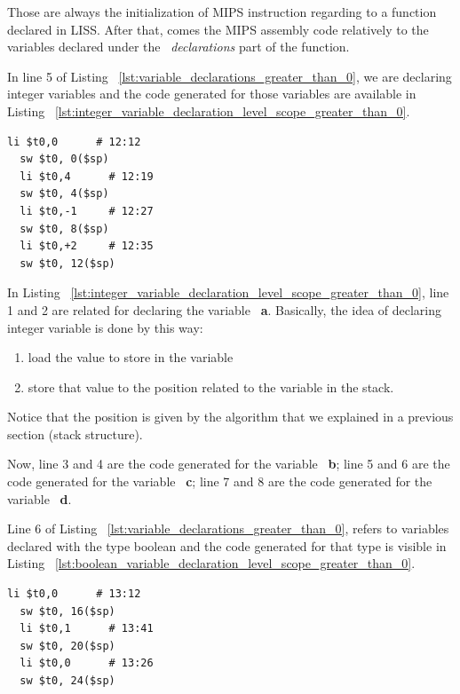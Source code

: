 \documentclass[
  oneside,
  11pt, a4paper,
  footinclude=true,
  headinclude=true,
  cleardoublepage=empty
]{scrbook}
\begin{document}
Those are always the initialization of MIPS instruction regarding to a function declared in LISS. After that, comes the MIPS assembly code relatively to the variables declared under the ~\textit{declarations} part of the function.

In line 5 of Listing ~\ref{lst:variable_declarations_greater_than_0}, we are declaring integer variables and the code generated for those variables are available in Listing ~\ref{lst:integer_variable_declaration_level_scope_greater_than_0}.

\begin{lstlisting}[caption={Declaring integer variables in level scope greater than 0 on MIPS.},label={lst:integer_variable_declaration_level_scope_greater_than_0}]
  li $t0,0		# 12:12
  sw $t0, 0($sp)
  li $t0,4		# 12:19
  sw $t0, 4($sp)
  li $t0,-1		# 12:27
  sw $t0, 8($sp)
  li $t0,+2		# 12:35
  sw $t0, 12($sp)
\end{lstlisting}

In Listing ~\ref{lst:integer_variable_declaration_level_scope_greater_than_0}, line 1 and 2 are related for declaring the variable ~\textbf{a}. Basically, the idea of declaring integer variable is done by this way: 

\begin{enumerate}
\item load the value to store in the variable
\item store that value to the position related to the variable in the stack.
\end{enumerate}

Notice that the position is given by the algorithm that we explained in a previous section (stack structure).

Now, line 3 and 4 are the code generated for the variable ~\textbf{b}; line 5 and 6 are the code generated for the variable ~\textbf{c}; line 7 and 8 are the code generated for the variable ~\textbf{d}.

Line 6 of Listing ~\ref{lst:variable_declarations_greater_than_0}, refers to variables declared with the type boolean and the code generated for that type is visible in Listing ~\ref{lst:boolean_variable_declaration_level_scope_greater_than_0}.

\begin{lstlisting}[caption={Declaring boolean variables in level scope greater than 0},label={lst:boolean_variable_declaration_level_scope_greater_than_0}]
  li $t0,0		# 13:12
  sw $t0, 16($sp)
  li $t0,1		# 13:41
  sw $t0, 20($sp)
  li $t0,0		# 13:26
  sw $t0, 24($sp)
\end{lstlisting}
\end{document}
